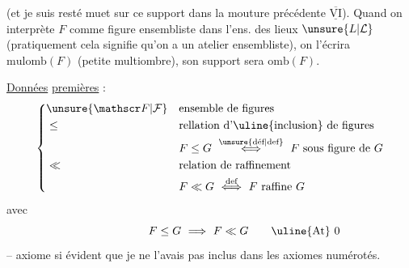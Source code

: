 (et je suis resté muet sur ce support dans la mouture précédente  $\underline{\overline{\mathrm{VI}}}$). Quand on interprète $F$ comme figure ensembliste dans l'ens. des lieux $\unsure{L|\mathcal L}$  (pratiquement cela signifie qu'on a un atelier ensembliste), on l'écrira $\mathrm{mulomb}(F)$ (petite multiombre), son support sera $\mathrm{omb}(F)$.

\uline{Données} \uline{premières} :
\[
\left\{\begin{aligned}
&\unsure{\mathscr F|\mathcal F} &&\text{ensemble de figures}\\
&\leq &&\text{rellation d'\uline{inclusion} de figures}\\
& &&F\leq G\ \overset{\text{\unsure{déf|def}}}{\Longleftrightarrow}\ F\ \text{sous figure de }G\\
&\ll &&\text{relation de raffinement}\\
& && F\ll G\ \overset{\text{def}}{\Longleftrightarrow}\ F\ \text{raffine }G
\end{aligned}\right.
\]
avec
\[
F\leq G\ \Longrightarrow\ F\ll G\tag*{\makebox[0pt][r]{\makebox[\displaywidth][l]{\uline{At} 0}}}
\]
-- axiome si évident que je ne l'avais pas inclus dans les axiomes numérotés.


